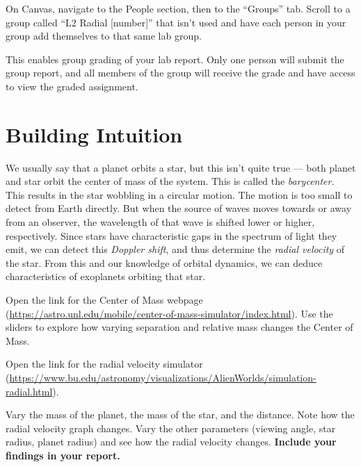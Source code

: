 \begin{steps}
	\item On Canvas, navigate to the People section, then to the ``Groups'' tab. Scroll to a group called ``L2 Radial [number]'' that isn't used and have each person in your group add themselves to that same lab group.
\end{steps}

This enables group grading of your lab report. Only one person will submit the group report, and all members of the group will receive the grade and have access to view the graded assignment.

\section{Building Intuition}

We usually say that a planet orbits a star, but this isn't quite true --- both planet and star orbit the center of mass of the system. This is called the \textit{barycenter}. This results in the star wobbling in a circular motion. The motion is too small to detect from Earth directly. But when the source of waves moves towards or away from an observer, the wavelength of that wave is shifted lower or higher, respectively. Since stars have characteristic gaps in the spectrum of light they emit, we can detect this \textit{Doppler shift}, and thus determine the \textit{radial velocity} of the star. From this and our knowledge of orbital dynamics, we can deduce characteristics of exoplanets orbiting that star.

\begin{steps}
	\item Open the link for the Center of Mass webpage (\url{https://astro.unl.edu/mobile/center-of-mass-simulator/index.html}). Use the sliders to explore how varying separation and relative mass changes the Center of Mass.
	
	\item Open the link for the radial velocity simulator (\url{https://www.bu.edu/astronomy/visualizations/AlienWorlds/simulation-radial.html}).
		
	\item Vary the mass of the planet, the mass of the star, and the distance. Note how the radial velocity graph changes. Vary the other parameters (viewing angle, star radius, planet radius) and see how the radial velocity changes. \textbf{Include your findings in your report.}		
\end{steps}

